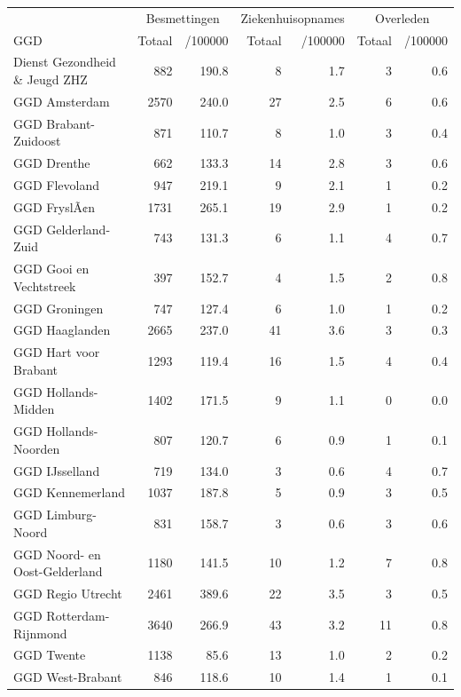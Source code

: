 \documentclass[
  english,
  man,floatsintext]{apa6}
\begin{document}
\begin{table}
\centering\begingroup\fontsize{10}{12}\selectfont

\begin{threeparttable}
\begin{tabular}{lrrrrrr}
\toprule
\multicolumn{1}{c}{ } & \multicolumn{2}{c}{Besmettingen} & \multicolumn{2}{c}{Ziekenhuisopnames} & \multicolumn{2}{c}{Overleden} \\
\cmidrule(l{3pt}r{3pt}){2-3} \cmidrule(l{3pt}r{3pt}){4-5} \cmidrule(l{3pt}r{3pt}){6-7}
GGD & Totaal & /100000 & Totaal & /100000 & Totaal & /100000\\
\midrule
Dienst Gezondheid \& Jeugd ZHZ & 882 & 190.8 & 8 & 1.7 & 3 & 0.6\\
GGD Amsterdam & 2570 & 240.0 & 27 & 2.5 & 6 & 0.6\\
GGD Brabant-Zuidoost & 871 & 110.7 & 8 & 1.0 & 3 & 0.4\\
GGD Drenthe & 662 & 133.3 & 14 & 2.8 & 3 & 0.6\\
GGD Flevoland & 947 & 219.1 & 9 & 2.1 & 1 & 0.2\\
GGD FryslÃ¢n & 1731 & 265.1 & 19 & 2.9 & 1 & 0.2\\
GGD Gelderland-Zuid & 743 & 131.3 & 6 & 1.1 & 4 & 0.7\\
GGD Gooi en Vechtstreek & 397 & 152.7 & 4 & 1.5 & 2 & 0.8\\
GGD Groningen & 747 & 127.4 & 6 & 1.0 & 1 & 0.2\\
GGD Haaglanden & 2665 & 237.0 & 41 & 3.6 & 3 & 0.3\\
GGD Hart voor Brabant & 1293 & 119.4 & 16 & 1.5 & 4 & 0.4\\
GGD Hollands-Midden & 1402 & 171.5 & 9 & 1.1 & 0 & 0.0\\
GGD Hollands-Noorden & 807 & 120.7 & 6 & 0.9 & 1 & 0.1\\
GGD IJsselland & 719 & 134.0 & 3 & 0.6 & 4 & 0.7\\
GGD Kennemerland & 1037 & 187.8 & 5 & 0.9 & 3 & 0.5\\
GGD Limburg-Noord & 831 & 158.7 & 3 & 0.6 & 3 & 0.6\\
GGD Noord- en Oost-Gelderland & 1180 & 141.5 & 10 & 1.2 & 7 & 0.8\\
GGD Regio Utrecht & 2461 & 389.6 & 22 & 3.5 & 3 & 0.5\\
GGD Rotterdam-Rijnmond & 3640 & 266.9 & 43 & 3.2 & 11 & 0.8\\
GGD Twente & 1138 & 85.6 & 13 & 1.0 & 2 & 0.2\\
GGD West-Brabant & 846 & 118.6 & 10 & 1.4 & 1 & 0.1\\

\end{tabular}
\end{threeparttable}
\end{table}
\end{document}

